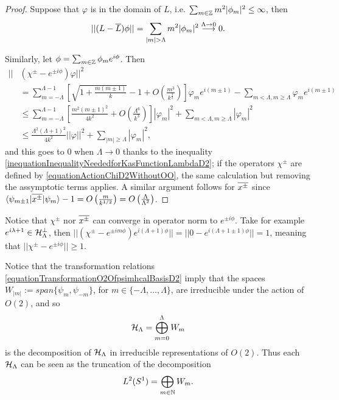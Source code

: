\begin{proof}
Suppose that $\varphi$ is in the domain of $L$, i.e. $\sum_{m \in \ZZ} m^2 |\phi_m|^2 \leq \infty$, then
\begin{align*}
    ||(L - \cut L)\varphi|| = \sum_{|m| > \Lambda} m^2 |\phi_m|^2 \overset{\Lambda \to 0}{\longrightarrow} 0.
\end{align*}

Similarly, let $\varphi = \sum_{m \in \ZZ} \varphi_m e^{i \phi}$. Then
\begin{align*}
    ||&(\chi^\pm - e^{\pm i \phi})\varphi||^2 \\
    &= \sum_{m = - \Lambda}^{\Lambda-1} \left[ \sqrt{1 + \frac{m(m \pm 1)}{k}} - 1 + O\left(\frac{m^3}{k^{\frac{3}{2}}} \right)\right] \varphi_m e^{i(m \pm 1)} - \sum_{m < \Lambda, m \geq \Lambda} \varphi_m e^{i(m \pm 1)}\\
    &\leq \sum_{m = -\Lambda}^{\Lambda-1} \left[\frac{m^2(m\pm 1)^2}{4k^2} + O\left(\frac{\Lambda^6}{k^{3}} \right)\right] |\varphi_m|^2 + \sum_{m < \Lambda, m \geq \Lambda} |\varphi_m|^2 \\
    &\leq \frac{\Lambda^2(\Lambda+1)^2}{4k^2} ||\varphi||^2 + \sum_{|m|\geq \Lambda} |\varphi_m|^2,
\end{align*}
and this goes to $0$ when $\Lambda \to 0$ thanks to the inequality \eqref{inequationInequalityNeededforKasFunctionLambdaD2}; if the operators $\chi^\pm$ are defined by \eqref{equationActionChiD2WithoutOO}, the same calculation but removing the assymptotic terms applies. A similar argument follows for $\overline{x^\pm}$ since $\langle\psi_{m\pm 1} | \overline{x^\pm} | \psi_m\rangle - 1 = O\left(\frac{m}{k^{1/2}}\right) = O\left(\frac{\Lambda}{\Lambda^2} \right)$.
\end{proof}

Notice that $\chi^\pm$ nor $\overline{x^\pm}$ can converge in operator norm to $e^{\pm i\phi}$. Take for example $e^{i \lambda + 1} \in \mathcal H_\Lambda^\perp$, then $||(\chi^\pm -e^{\pm i m \phi})e^{i(\Lambda+1)\phi} || = ||0 - e^{i (\Lambda + 1 \pm 1) \phi}|| = 1$, meaning that $||\chi^\pm - e^{\pm i \phi}|| \geq 1$.

Notice that the transformation relations \eqref{equationTransformationO2OfpsimhcalBasisD2} imply that the spaces $W_{|m|} := span\{\psi_m, \psi_{-m}\}$, for $m \in \{-\Lambda, \dots, \Lambda\}$, are irreducible under the action of $O(2)$, and so
\begin{equation}
    \mathcal H_\Lambda = \bigoplus_{m = 0}^{\Lambda} W_m
\end{equation}
is the decomposition of $\mathcal H_\Lambda$ in irreducible representations of $O(2)$. Thus each $\mathcal H_\Lambda$ can be seen as the truncation of the decomposition
\begin{equation}
    L^2(S^1) = \bigoplus_{m  \in \mathbb{N}} W_m.
\end{equation}

